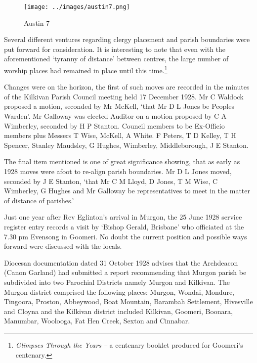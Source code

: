 \begin{figure}[!htb]
\begin{center}
\texttt{[image: ../images/austin7.png]}
\caption{Austin 7}
\end{center}
\end{figure}




Several different ventures regarding clergy placement and parish boundaries were put forward for consideration. It is interesting to note that even with the aforementioned `tyranny of distance' between centres, the large number of worship places had remained in place until this time.\footnote{\emph{Glimpses Through the Years --} a centenary booklet produced for Goomeri's centenary.}


Changes were on the horizon, the first of such moves are recorded in the minutes of the Kilkivan Parish Council meeting held 17 December 1928. Mr C Waldock proposed a motion, seconded by Mr McKell, `that Mr D L Jones be Peoples Warden'. Mr Galloway was elected Auditor on a motion proposed by C A Wimberley, seconded by H P Stanton. Council members to be Ex-Officio members plus Messers T Wise, McKell, A White. F Peters, T D Kelley, T H Spencer, Stanley Maudsley, G Hughes, Wimberley, Middleborough, J E Stanton.



The final item mentioned is one of great significance showing, that as early as 1928 moves were afoot to re-align parish boundaries. Mr D L Jones moved, seconded by J E Stanton, `that Mr C M Lloyd, D Jones, T M Wise, C Wimberley, G Hughes and Mr Galloway be representatives to meet in the matter of distance of parishes.'



Just one year after Rev Eglinton's arrival in Murgon, the 25 June 1928 service register entry records a visit by `Bishop Gerald, Brisbane' who officiated at the 7.30 pm Evensong in Goomeri. No doubt the current position and possible ways forward were discussed with the locals.



Diocesan documentation dated 31 October 1928 advises that the Archdeacon (Canon Garland) had submitted a report recommending that Murgon parish be subdivided into two Parochial Districts namely Murgon and Kilkivan. The Murgon district comprised the following places: Murgon, Wondai, Mondure, Tingoora, Proston, Abbeywood, Boat Mountain, Barambah Settlement, Hivesville and Cloyna and the Kilkivan district included Kilkivan, Goomeri, Boonara, Manumbar, Woolooga, Fat Hen Creek, Sexton and Cinnabar.



